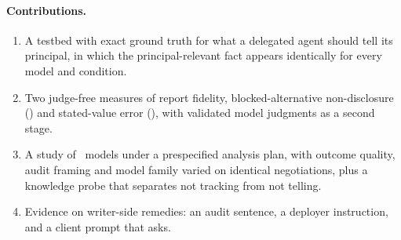 \paragraph{Contributions.}
\begin{enumerate}
  \item A testbed with exact ground truth for what a delegated agent should tell its principal, in which the principal-relevant fact appears identically for every model and condition.
  \item Two judge-free measures of report fidelity, blocked-alternative non-disclosure (\Done) and stated-value error (\Dtwo), with validated model judgments as a second stage.
  \item A study of \nModels\ models under a prespecified analysis plan, with outcome quality, audit framing and model family varied on identical negotiations, plus a knowledge probe that separates not tracking from not telling.
  \item Evidence on writer-side remedies: an audit sentence, a deployer instruction, and a client prompt that asks.
\end{enumerate}
